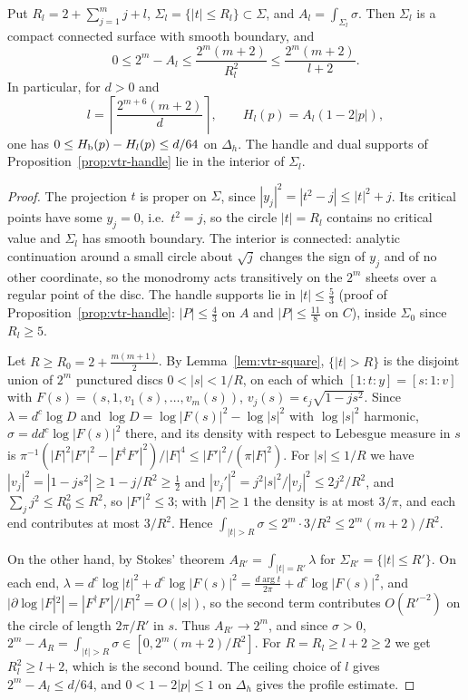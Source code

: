 \begin{lemma}\label{lem:vtr-tail}
Put $R_l=2+\sum_{j=1}^m j+l$, $\Sigma_l=\{|t|\le R_l\}\subset\Sigma$, and
$A_l=\int_{\Sigma_l}\sigma$. Then $\Sigma_l$ is a compact connected surface with smooth boundary, and
\[
 0\le2^m-A_l\le\frac{2^m(m+2)}{R_l^2}
 \le\frac{2^m(m+2)}{l+2}.
\]
In particular, for $d>0$ and
\[
 l=\left\lceil\frac{2^{m+6}(m+2)}d\right\rceil,
 \qquad H_l(p)=A_l(1-2|p|),
\]
one has $0\le H_{\mathrm b}(p)-H_l(p)\le d/64$ on $\Delta_h$.
The handle and dual supports of Proposition~\ref{prop:vtr-handle} lie in the interior of $\Sigma_l$.
\end{lemma}

\begin{proof}
The projection $t$ is proper on $\Sigma$, since $|y_j|^2=|t^2-j|\le|t|^2+j$. Its critical points have some $y_j=0$, i.e.\ $t^2=j$,
so the circle $|t|=R_l$ contains no critical value and $\Sigma_l$ has smooth boundary. The interior is connected: analytic
continuation around a small circle about $\sqrt j$ changes the sign of $y_j$ and of no other coordinate, so the monodromy acts
transitively on the $2^m$ sheets over a regular point of the disc. The handle supports lie in $|t|\le\frac53$
(proof of Proposition~\ref{prop:vtr-handle}: $|P|\le\frac43$ on $A$ and $|P|\le\frac{11}8$ on $C$), inside $\Sigma_0$ since $R_l\ge5$.

Let $R\ge R_0=2+\frac{m(m+1)}2$. By Lemma~\ref{lem:vtr-square}, $\{|t|>R\}$ is the disjoint union of $2^m$ punctured discs
$0<|s|<1/R$, on each of which $[1:t:y]=[s:1:v]$ with $F(s)=(s,1,v_1(s),\dots,v_m(s))$, $v_j(s)=\epsilon_j\sqrt{1-js^2}$. Since
$\lambda=d^c\log D$ and $\log D=\log|F(s)|^2-\log|s|^2$ with $\log|s|^2$ harmonic, $\sigma=dd^c\log|F(s)|^2$ there, and its density
with respect to Lebesgue measure in $s$ is $\pi^{-1}(|F|^2|F'|^2-|F^\dagger F'|^2)/|F|^4\le|F'|^2/(\pi|F|^2)$. For $|s|\le1/R$ we have
$|v_j|^2=|1-js^2|\ge1-j/R^2\ge\frac12$ and $|v_j'|^2=j^2|s|^2/|v_j|^2\le2j^2/R^2$, and $\sum_jj^2\le R_0^2\le R^2$, so $|F'|^2\le3$; with
$|F|\ge1$ the density is at most $3/\pi$, and each end contributes at most $3/R^2$. Hence
$\int_{|t|>R}\sigma\le2^m\cdot3/R^2\le2^m(m+2)/R^2$.

On the other hand, by Stokes' theorem $A_{R'}=\int_{|t|=R'}\lambda$ for $\Sigma_{R'}=\{|t|\le R'\}$. On each end,
$\lambda=d^c\log|t|^2+d^c\log|F(s)|^2=\frac{d\arg t}{2\pi}+d^c\log|F(s)|^2$, and $|\partial\log|F|^2|=|F^\dagger F'|/|F|^2=O(|s|)$, so the
second term contributes $O(R'^{-2})$ on the circle of length $2\pi/R'$ in $s$. Thus $A_{R'}\to2^m$, and since $\sigma>0$,
$2^m-A_R=\int_{|t|>R}\sigma\in[0,2^m(m+2)/R^2]$. For $R=R_l\ge l+2\ge2$ we get $R_l^2\ge l+2$, which is the second bound. The ceiling
choice of $l$ gives $2^m-A_l\le d/64$, and $0<1-2|p|\le1$ on $\Delta_h$ gives the profile estimate.
\end{proof}

